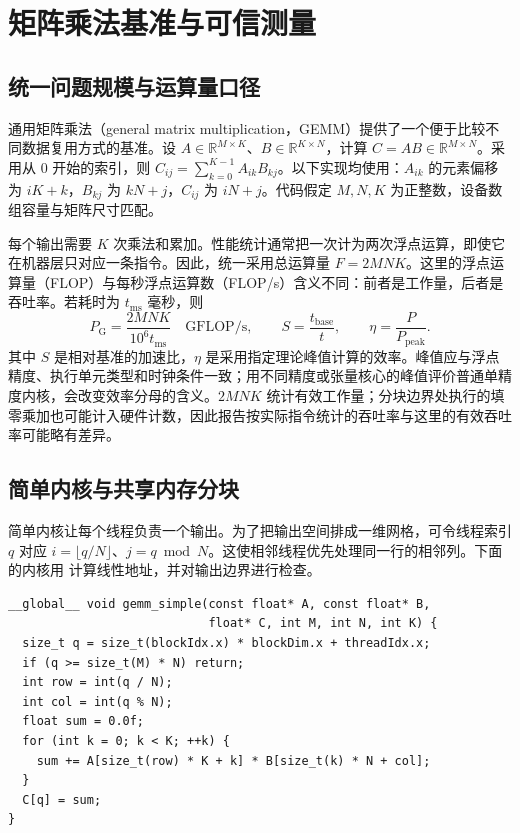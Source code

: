 \section{矩阵乘法基准与可信测量}
\label{l14:sec:measurement}

\subsection{统一问题规模与运算量口径}

通用矩阵乘法（general matrix multiplication，GEMM）提供了一个便于比较不同数据复用方式的基准。设 $A\in\mathbb{R}^{M\times K}$、$B\in\mathbb{R}^{K\times N}$，计算 $C=AB\in\mathbb{R}^{M\times N}$。采用从 $0$ 开始的索引，则 $C_{ij}=\sum_{k=0}^{K-1}A_{ik}B_{kj}$。以下实现均使用：$A_{ik}$ 的元素偏移为 $iK+k$，$B_{kj}$ 为 $kN+j$，$C_{ij}$ 为 $iN+j$。代码假定 $M,N,K$ 为正整数，设备数组容量与矩阵尺寸匹配。

每个输出需要 $K$ 次乘法和累加。性能统计通常把一次计为两次浮点运算，即使它在机器层只对应一条指令。因此，统一采用总运算量 $F=2MNK$。这里的浮点运算量（FLOP）与每秒浮点运算数（FLOP/s）含义不同：前者是工作量，后者是吞吐率。若耗时为 $t_{\mathrm{ms}}$ 毫秒，则
\begin{equation}
  P_{\mathrm{G}}=\frac{2MNK}{10^6t_{\mathrm{ms}}}
  \quad\text{GFLOP/s},\qquad
  S=\frac{t_{\mathrm{base}}}{t},\qquad
  \eta=\frac{P}{P_{\mathrm{peak}}}.
  \label{l14:eq:performance}
\end{equation}
其中 $S$ 是相对基准的加速比，$\eta$ 是采用指定理论峰值计算的效率。峰值应与浮点精度、执行单元类型和时钟条件一致；用不同精度或张量核心的峰值评价普通单精度内核，会改变效率分母的含义。$2MNK$ 统计有效工作量；分块边界处执行的填零乘加也可能计入硬件计数，因此报告按实际指令统计的吞吐率与这里的有效吞吐率可能略有差异。

\subsection{简单内核与共享内存分块}

简单内核让每个线程负责一个输出。为了把输出空间排成一维网格，可令线程索引 $q$ 对应 $i=\lfloor q/N\rfloor$、$j=q\bmod N$。这使相邻线程优先处理同一行的相邻列。下面的内核用  计算线性地址，并对输出边界进行检查。

\noindent\begin{minipage}{\linewidth}
\begin{lstlisting}[caption={每线程计算一个输出的简单矩阵乘法},label={l14:lst:simple}]
__global__ void gemm_simple(const float* A, const float* B,
                            float* C, int M, int N, int K) {
  size_t q = size_t(blockIdx.x) * blockDim.x + threadIdx.x;
  if (q >= size_t(M) * N) return;
  int row = int(q / N);
  int col = int(q % N);
  float sum = 0.0f;
  for (int k = 0; k < K; ++k) {
    sum += A[size_t(row) * K + k] * B[size_t(k) * N + col];
  }
  C[q] = sum;
}
\end{lstlisting}
\end{minipage}

